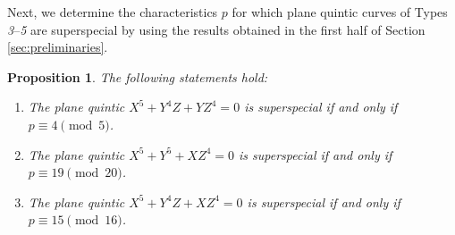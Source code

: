 \documentclass[10pt,a4paper]{amsart}
\newtheorem{Prop}[Def]{Proposition}
\begin{document}
Next, we determine the characteristics $p$ for which plane quintic curves of Types \hspace{-0.2mm}\textit{3}--\textit{5} are superspecial by using the results obtained in the first half of Section \ref{sec:preliminaries}.\vspace{-1mm}
\begin{Prop}\label{prop:type3-5}
The following statements hold:\vspace{-0.6mm}
\begin{enumerate}
\item[(1)] The plane quintic $X^5+Y^4Z+YZ^4 = 0$ is superspecial if and only if $p \equiv 4 \pmod{5}$.\vspace{-2.6mm}
\item[(2)] The plane quintic $X^5+Y^5+XZ^4 = 0$ is superspecial if and only if $p \equiv 19 \pmod{20}$.\vspace{-2.6mm}
\item[(3)] The plane quintic $X^5+Y^4Z+XZ^4 = 0$ is superspecial if and only if $p \equiv 15 \pmod{16}$.\vspace{0.3mm}
\end{enumerate}
\end{Prop}
\end{document}
